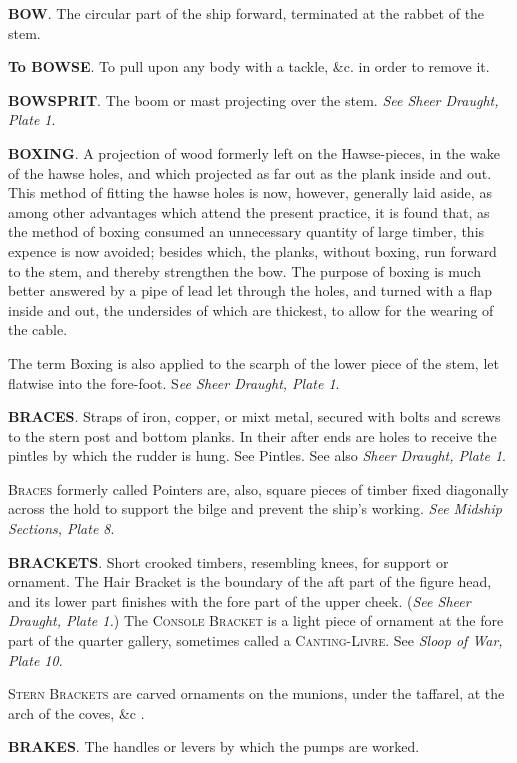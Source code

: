 \textbf{BOW}. The circular part of the ship forward, terminated at the rabbet of the stem. 

\textbf{To BOWSE}. To pull upon any body with a tackle, \&c. in order to remove it. 

\textbf{BOWSPRIT}. The boom or mast projecting over the stem. \textit{See Sheer Draught, Plate 1}. 

\textbf{BOXING}. A projection of wood formerly left on the Hawse-pieces, in the wake of the hawse holes, and which projected as far out as the plank inside and out. This method of fitting the hawse holes is now, however, generally laid aside, as among other advantages which attend the present practice, it is found that, as the method of boxing consumed an unnecessary quantity of large timber, this expence is now avoided; besides which, the planks, without boxing, run forward to the stem, and thereby strengthen the bow. The purpose of boxing is much better answered by a pipe of lead let through the holes, and turned with a flap inside and out, the undersides of which are thickest, to allow for the wearing of the cable. 

The term Boxing is also applied to the scarph of the lower piece of the stem, let flatwise into the fore-foot. S\textit{ee Sheer Draught, Plate 1}. 

\textbf{BRACES}. Straps of iron, copper, or mixt metal, secured with bolts and screws to the stern post and bottom planks. In their after ends are holes to receive the pintles by which the rudder is hung. See Pintles. See also \textit{Sheer Draught, Plate 1}. 

\textsc{Braces} formerly called Pointers are, also, square pieces of timber fixed diagonally across the hold to support the bilge and prevent the ship's working. \textit{See Midship Sections, Plate 8}. 

\textbf{BRACKETS}. Short crooked timbers, resembling knees, for support or ornament. The Hair Bracket is the boundary of the aft part of the figure head, and its lower part finishes with the fore part of the upper cheek. (\textit{See Sheer Draught, Plate 1.}) The \textsc{Console Bracket} is a light piece of ornament at the fore part of the quarter gallery, sometimes called a \textsc{Canting-Livre}. See \textit{Sloop of War, Plate 10}. 

\textsc{Stern Brackets} are carved ornaments on the munions, under the taffarel, at the arch of the coves, \&c . 

\textbf{BRAKES}. The handles or levers by which the pumps are worked. 

